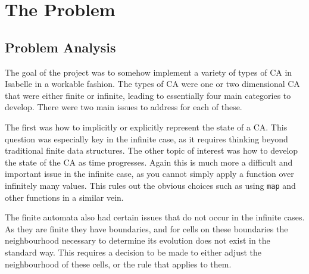 \chapter{The Problem}

\section{Problem Analysis}

The goal of the project was to somehow implement a variety of types of CA in Isabelle in a workable fashion.
The types of CA were one or two dimensional CA that were either finite or infinite,
leading to essentially four main categories to develop.
There were two main issues to address for each of these.

The first was how to implicitly or explicitly represent the state of a CA.
This question was especially key in the infinite case, 
as it requires thinking beyond traditional finite data structures.
The other topic of interest was how to develop the state of the CA as time progresses.
Again this is much more a difficult and important issue in the infinite case,
as you cannot simply apply a function over infinitely many values.
This rules out the obvious choices such as using \texttt{map} and other functions in a similar vein.

The finite automata also had certain issues that do not occur in the infinite cases.
As they are finite they have boundaries,
and for cells on these boundaries the neighbourhood necessary to determine its evolution does not exist in the standard way.
This requires a decision to be made to either adjust the neighbourhood of these cells,
or the rule that applies to them.
